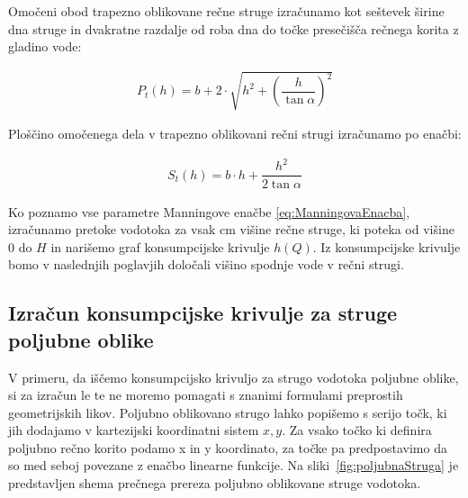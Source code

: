 \begin{enumerate}
	Omočeni obod trapezno oblikovane rečne struge izračunamo kot seštevek širine dna struge in dvakratne razdalje od roba dna do točke presečišča rečnega korita z gladino vode:
	
	\begin{ceqn}
	\begin{align}
	P_{t}(h) = b + 2 \cdot \sqrt{h^2 + \left(\dfrac{h} {\tan\alpha} \right)^{2}}
	\end{align}
	\end{ceqn}
	
	Ploščino omočenega dela v trapezno oblikovani rečni strugi izračunamo po enačbi:
	\begin{ceqn}
	\begin{align}
	S_{t}(h) = b \cdot h + \dfrac{h^2}{ 2\tan\alpha}
	\end{align}
	\end{ceqn}
	
\end{enumerate}



Ko poznamo vse parametre Manningove enačbe \ref{eq:ManningovaEnacba}, izračunamo pretoke vodotoka za vsak cm višine rečne struge, ki poteka od višine 0 do $H$ in narišemo graf konsumpcijske krivulje $h(Q)$. Iz konsumpcijske krivulje bomo v naslednjih poglavjih določali višino spodnje vode v rečni strugi.


\newpage
\subsection{Izračun konsumpcijske krivulje za struge poljubne oblike}\label{sec:pretokNumericnaMetoda}


V primeru, da iščemo konsumpcijsko krivuljo za strugo vodotoka poljubne oblike, si za izračun le te ne moremo pomagati s znanimi formulami preprostih geometrijskih likov. Poljubno oblikovano strugo lahko popišemo s serijo točk, ki jih dodajamo v kartezijski koordinatni sistem $x,y$. Za vsako točko ki definira poljubno rečno korito podamo x in y koordinato, za točke pa predpostavimo da so med seboj povezane z enačbo linearne funkcije. Na sliki~\ref{fig:poljubnaStruga} je predstavljen shema prečnega prereza poljubno oblikovane struge vodotoka.

